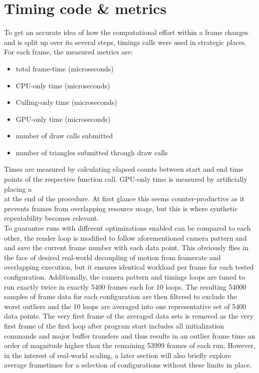 \section{Timing code \& metrics} \label{bmark_metrics}
To get an accurate idea of how the computational effort within a frame changes and is split up over its several steps,  timings calls were used in strategic places. For each frame, the measured metrics are: \begin{itemize}
\item total frame-time (microseconds)
\item CPU-only time (microseconds)
\item Culling-only time (microseconds)
\item GPU-only time (microseconds)
\item number of draw calls submitted
\item number of triangles submitted through draw calls
\end{itemize}
Times are measured by calculating elapsed counts between start and end time points of the respective function call. GPU-only time is measured by artificially placing a \\ at the end of the  procedure. At first glance this seems counter-productive as it prevents frames from overlapping resource usage, but this is where synthetic repeatability becomes relevant. \\
To guarantee runs with different optimizations enabled can be compared to each other, the render loop is modified to follow aforementioned camera pattern and and save the current frame number with each data point. This obviously flies in the face of desired real-world decoupling of motion from framerate and overlapping execution, but it ensures identical workload per frame for each tested configuration. Additionally, the camera pattern and timings loops are tuned to run exactly twice in exactly 5400 frames each for 10 loops. The resulting 54000 samples of frame data for each configuration are then filtered to exclude the worst outliers and the 10 loops are averaged into one representative set of 5400 data points. The very first frame of the averaged data sets is removed as the very first frame of the first loop after program start includes all initialization commands and major buffer transfers and thus results in an outlier frame time an order of magnitude higher than the remaining 53999 frames of each run. However, in the interest of real-world scaling, a later section will also briefly explore average frametimes for a selection of configurations without these limits in place. \\
